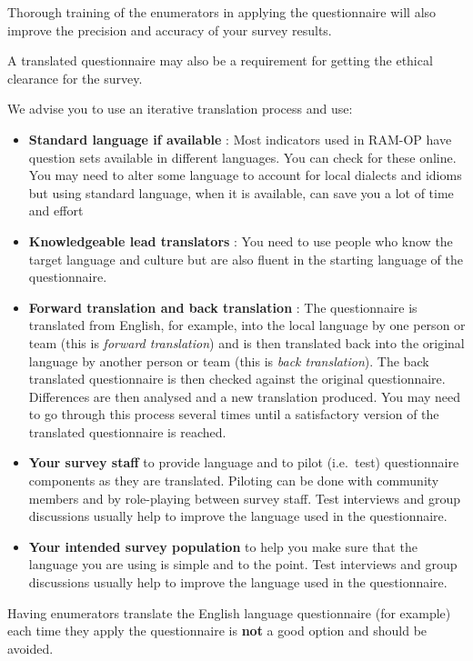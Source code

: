\documentclass[12pt,a4paper]{book}
\theoremstyle{definition}
\theoremstyle{definition}
\theoremstyle{definition}
\theoremstyle{remark}
\begin{document}
Thorough training of the enumerators in applying the questionnaire will
also improve the precision and accuracy of your survey results.

A translated questionnaire may also be a requirement for getting the
ethical clearance for the survey.

We advise you to use an iterative translation process and use:

\begin{itemize}
\item
  \textbf{Standard language if available} : Most indicators used in
  RAM-OP have question sets available in different languages. You can
  check for these online. You may need to alter some language to account
  for local dialects and idioms but using standard language, when it is
  available, can save you a lot of time and effort
\item
  \textbf{Knowledgeable lead translators} : You need to use people who
  know the target language and culture but are also fluent in the
  starting language of the questionnaire.
\item
  \textbf{Forward translation and back translation} : The questionnaire
  is translated from English, for example, into the local language by
  one person or team (this is \emph{forward translation}) and is then
  translated back into the original language by another person or team
  (this is \emph{back translation}). The back translated questionnaire
  is then checked against the original questionnaire. Differences are
  then analysed and a new translation produced. You may need to go
  through this process several times until a satisfactory version of the
  translated questionnaire is reached.
\item
  \textbf{Your survey staff} to provide language and to pilot
  (i.e.~test) questionnaire components as they are translated. Piloting
  can be done with community members and by role-playing between survey
  staff. Test interviews and group discussions usually help to improve
  the language used in the questionnaire.
\item
  \textbf{Your intended survey population} to help you make sure that
  the language you are using is simple and to the point. Test interviews
  and group discussions usually help to improve the language used in the
  questionnaire.
\end{itemize}

Having enumerators translate the English language questionnaire (for
example) each time they apply the questionnaire is \textbf{not} a good
option and should be avoided.
\end{document}
